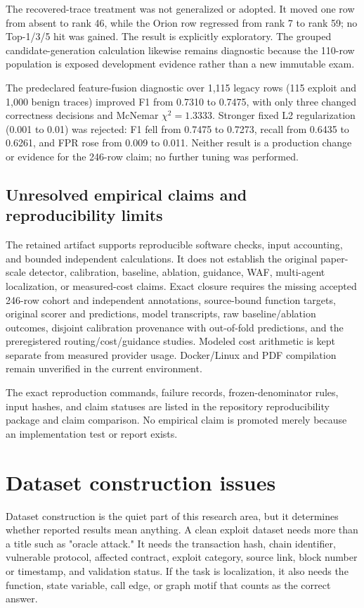 \documentclass[conference]{IEEEtran}
\begin{document}
The recovered-trace treatment was not generalized or adopted. It moved one
row from absent to rank 46, while the Orion row regressed from rank 7 to rank
59; no Top-1/3/5 hit was gained. The result is explicitly exploratory. The
grouped candidate-generation calculation likewise remains diagnostic because
the 110-row population is exposed development evidence rather than a new
immutable exam.

The predeclared feature-fusion diagnostic over 1,115 legacy rows (115 exploit
and 1,000 benign traces) improved F1 from 0.7310 to 0.7475, with only three
changed correctness decisions and McNemar $\chi^2=1.3333$. Stronger fixed L2
regularization (0.001 to 0.01) was rejected: F1 fell from 0.7475 to 0.7273,
recall from 0.6435 to 0.6261, and FPR rose from 0.009 to 0.011. Neither result
is a production change or evidence for the 246-row claim; no further tuning was
performed.

\subsection{Unresolved empirical claims and reproducibility limits}

The retained artifact supports reproducible software checks, input accounting,
and bounded independent calculations. It does not establish the original
paper-scale detector, calibration, baseline, ablation, guidance, WAF,
multi-agent localization, or measured-cost claims. Exact closure requires the
missing accepted 246-row cohort and independent annotations, source-bound
function targets, original scorer and predictions, model transcripts, raw
baseline/ablation outcomes, disjoint calibration provenance with out-of-fold
predictions, and the preregistered routing/cost/guidance studies. Modeled cost
arithmetic is kept separate from measured provider usage. Docker/Linux and PDF
compilation remain unverified in the current environment.

The exact reproduction commands, failure records, frozen-denominator rules,
input hashes, and claim statuses are listed in the repository reproducibility
package and claim comparison. No empirical claim is promoted merely because an
implementation test or report exists.

\section{Dataset construction issues}

Dataset construction is the quiet part of this research area, but it determines whether reported results mean anything. A clean exploit dataset needs more than a title such as "oracle attack." It needs the transaction hash, chain identifier, vulnerable protocol, affected contract, exploit category, source link, block number or timestamp, and validation status. If the task is localization, it also needs the function, state variable, call edge, or graph motif that counts as the correct answer.
\end{document}
